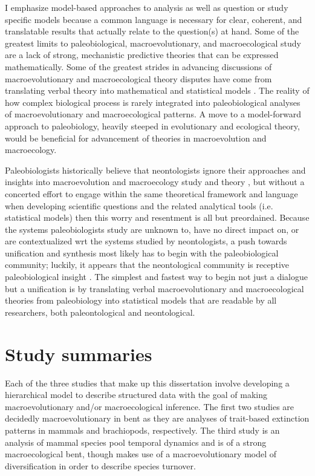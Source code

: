 I emphasize model-based approaches to analysis as well as question or study specific models because a common language is necessary for clear, coherent, and translatable results that actually relate to the question(s) at hand. Some of the greatest limits to paleobiological, macroevolutionary, and macroecological study are a lack of strong, mechanistic predictive theories that can be expressed mathematically. Some of the greatest strides in advancing discussions of macroevolutionary and macroecological theory disputes have come from translating verbal theory into mathematical and statistical models \citep{Raup1973,Nee1992,Felsenstein1985b,Hunt2006a,Hunt2007a,Shipley2006}. The reality of how complex biological process is rarely integrated into paleobiological analyses of macroevolutionary and macroecological patterns. A move to a model-forward approach to paleobiology, heavily steeped in evolutionary and ecological theory, would be beneficial for advancement of theories in macroevolution and macroecology. 

Paleobiologists historically believe that neontologists ignore their approaches and insights into macroevolution and macroecology study and theory \citep{Sepkoski2009,Sepkoski2015}, but without a concerted effort to engage within the same theoretical framework and language when developing scientific questions and the related analytical tools (i.e. statistical models) then this worry and resentment is all but preordained. Because the systems paleobiologists study are unknown to, have no direct impact on, or are contextualized wrt the systems studied by neontologists, a push towards unification and synthesis most likely has to begin with the paleobiological community; luckily, it appears that the neontological community is receptive paleobiological insight \citep{Fritz2013a}. The simplest and fastest way to begin not just a dialogue but a unification is by translating verbal macroevolutionary and macroecological theories from paleobiology into statistical models that are readable by all researchers, both paleontological and neontological.


\section{Study summaries}  %

Each of the three studies that make up this dissertation involve developing a hierarchical model to describe structured data with the goal of making macroevolutionary and/or macroecological inference. The first two studies are decidedly macroevolutionary in bent as they are analyses of trait-based extinction patterns in mammals and brachiopods, respectively. The third study is an analysis of mammal species pool temporal dynamics and is of a strong macroecological bent, though makes use of a macroevolutionary model of diversification in order to describe species turnover.


